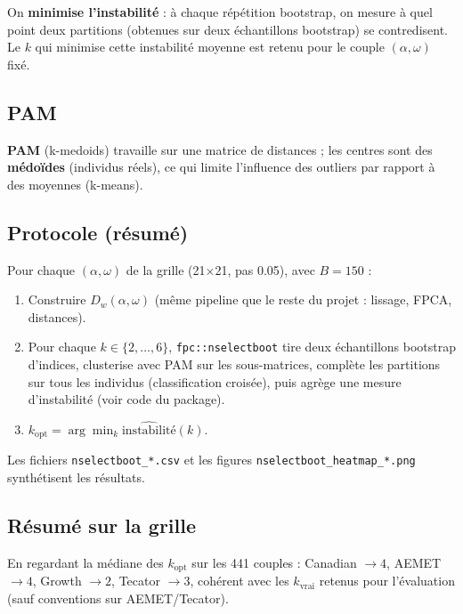\documentclass[11pt, a4paper]{article}
\begin{document}
On \textbf{minimise l'instabilité} : à chaque répétition bootstrap, on mesure à quel
point deux partitions (obtenues sur deux échantillons bootstrap) se contredisent.
Le $k$ qui minimise cette instabilité moyenne est retenu pour le couple
$(\alpha,\omega)$ fixé.

\subsection{PAM}

\textbf{PAM} (k-medoids) travaille sur une matrice de distances ; les centres sont
des \textbf{médoïdes} (individus réels), ce qui limite l'influence des outliers
par rapport à des moyennes (k-means).

\subsection{Protocole (résumé)}

Pour chaque $(\alpha,\omega)$ de la grille (21×21, pas 0.05), avec $B=150$ :

\begin{enumerate}
  \item Construire $D_w(\alpha,\omega)$ (même pipeline que le reste du projet :
    lissage, FPCA, distances).
  \item Pour chaque $k \in \{2,\ldots,6\}$, \texttt{fpc::nselectboot} tire deux
    échantillons bootstrap d'indices, clusterise avec PAM sur les sous-matrices,
    complète les partitions sur tous les individus (classification croisée), puis
    agrège une mesure d'instabilité (voir code du package).
  \item $k_\text{opt} = \arg\min_k \widehat{\text{instabilité}}(k)$.
\end{enumerate}

Les fichiers \texttt{nselectboot\_*.csv} et les figures
\texttt{nselectboot\_heatmap\_*.png} synthétisent les résultats.

\subsection{Résumé sur la grille}

En regardant la médiane des $k_\text{opt}$ sur les 441 couples : Canadian
$\to 4$, AEMET $\to 4$, Growth $\to 2$, Tecator $\to 3$, cohérent avec les
$k_{\mathrm{vrai}}$ retenus pour l'évaluation (sauf conventions sur AEMET/Tecator).

\end{document}
